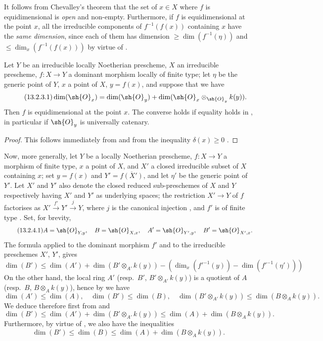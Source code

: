 It follows from Chevalley's theorem  that the set of $x\in X$ where $f$ is equidimensional is \emph{open} and non-empty.
Furthermore, if $f$ is equidimensional at the point $x$, all the irreducible components of $f^{-1}(f(x))$ containing $x$ have the \emph{same dimension}, since each of them has dimension $\geq\dim(f^{-1}(\eta))$  and $\leq\dim_x(f^{-1}(f(x)))$ by virtue of .

\begin{proposition}[13.2.3]
\label{IV.13.2.3}
Let $Y$ be an irreducible locally Noetherian prescheme, $X$ an irreducible prescheme, $f:X\to Y$ a dominant morphism locally of finite type; let $\eta$ be the generic point of $Y$, $x$ a point of $X$, $y=f(x)$, and suppose that we have
\[
\label{IV.13.2.3.1}
\tag{13.2.3.1}
  \dim(\sh{O}_x)=\dim(\sh{O}_y)+\dim(\sh{O}_x\otimes_{\sh{O}_y}k(y)).
\]
Then $f$ is equidimensional at the point $x$.
The converse holds if equality holds in , in particular if $\sh{O}_y$ is universally catenary.
\end{proposition}

\begin{proof}
This follows immediately from  and from the inequality $\delta(x)\geq 0$ .
\end{proof}

\begin{env}[13.2.4]
\label{IV.13.2.4}
Now, more generally, let $Y$ be a locally Noetherian prescheme, $f:X\to Y$ a morphism of finite type, $x$ a point of $X$, and $X'$ a closed irreducible subset of $X$ containing $x$; set $y=f(x)$ and $Y'=\overline{f(X')}$, and let $\eta'$ be the generic point of $Y'$.
Let $X'$ and $Y'$ also denote the closed reduced sub-preschemes of $X$ and $Y$ respectively having $X'$ and $Y'$ as underlying spaces; the restriction $X'\to Y$ of $f$ factorises as $X'\xrightarrow{f'}Y'\xrightarrow{j}Y$, where $j$ is the canonical injection , and $f'$ is of finite type .
Set, for brevity,
\[
\label{IV.13.2.4.1}
\tag{13.2.4.1}
  A=\sh{O}_{Y,y},\quad B=\sh{O}_{X,x},\quad A'=\sh{O}_{Y',y},\quad B'=\sh{O}_{X',x}.
\]
The formula  applied to the dominant morphism $f'$ and to the irreducible preschemes $X'$, $Y'$, gives
\[
\label{IV.13.2.4.2}
\tag{13.2.4.2}
  \dim(B')\leq\dim(A')+\dim(B'\otimes_{A'}k(y))-(\dim_x(f'^{-1}(y))-\dim(f'^{-1}(\eta')))
\]
On the other hand, the local ring $A'$ (resp.\ $B'$, $B'\otimes_{A'}k(y)$) is a quotient of $A$ (resp.\ $B$, $B\otimes_A k(y)$), hence by  we have
\[
\tag{13.2.4.3}
\label{IV.13.2.4.3}
  \dim(A')\leq\dim(A),\quad \dim(B')\leq\dim(B),\quad \dim(B'\otimes_{A'}k(y))\leq\dim(B\otimes_A k(y)).
\]
We deduce therefore first from  and 
\[
\label{IV.13.2.4.4}
\tag{13.2.4.4}
  \dim(B')\leq\dim(A')+\dim(B'\otimes_{A'}k(y))\leq\dim(A)+\dim(B\otimes_A k(y)).
\]
Furthermore, by virtue of , we also have the inequalities
\[
\label{IV.13.2.4.5}
\tag{13.2.4.5}
  \dim(B')\leq\dim(B)\leq\dim(A)+\dim(B\otimes_A k(y)).
\]
\end{env}

